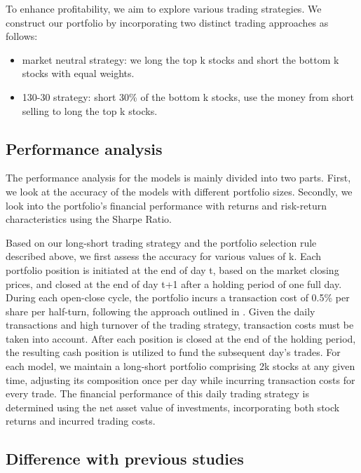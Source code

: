 \documentclass{article}
\begin{document}
To enhance profitability, we aim to explore various trading strategies. We construct our portfolio by incorporating two distinct trading approaches as follows:
\begin{itemize}
 \item market neutral strategy: we long the top k stocks and short the bottom k stocks with equal weights. 
 \item 130-30 strategy: short 30\% of the bottom k stocks, use the money from short selling to long the top k stocks. 
\end{itemize}

\subsection{Performance analysis}
The performance analysis for the models is mainly divided into two parts. First, we look at the accuracy of the models with different portfolio sizes. Secondly, we look into the portfolio's financial performance with returns and risk-return characteristics using the Sharpe Ratio. 

Based on our long-short trading strategy and the portfolio selection rule described above, we first assess the accuracy for various values of k. Each portfolio position is initiated at the end of day t, based on the market closing prices, and closed at the end of day t+1 after a holding period of one full day. During each open-close cycle, the portfolio incurs a transaction cost of 0.5\% per share per half-turn, following the approach outlined in \cite{krauss2017deep}. Given the daily transactions and high turnover of the trading strategy, transaction costs must be taken into account. After each position is closed at the end of the holding period, the resulting cash position is utilized to fund the subsequent day's trades. For each model, we maintain a long-short portfolio comprising 2k stocks at any given time, adjusting its composition once per day while incurring transaction costs for every trade. The financial performance of this daily trading strategy is determined using the net asset value of investments, incorporating both stock returns and incurred trading costs.

\subsection{Difference with previous studies}
\end{document}
